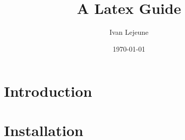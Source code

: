 \documentclass[french,a4paper,10pt]{article}
\title{\color{astral} \sffamily \bfseries A Latex Guide}
\author{Ivan Lejeune}
\date{\today}
\begin{document}
    
    \newpage

    \tableofcontents
    \newpage

    \section{Introduction}\label{sec:intro}
    
    \newpage

    \section{Installation}\label{sec:installation}
    
    \newpage
\end{document}
